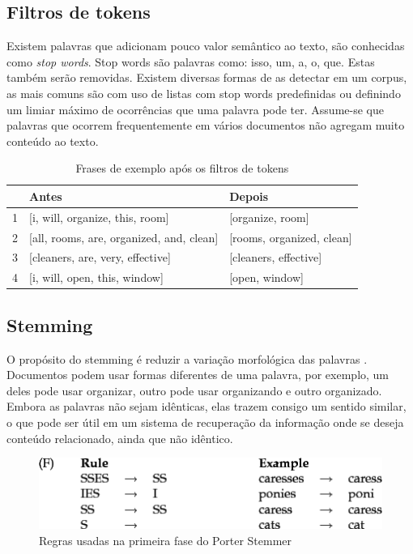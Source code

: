 \subsection{Filtros de tokens}
Existem palavras que adicionam pouco valor semântico ao texto, são conhecidas como \textit{stop words}. Stop words são palavras como: isso, um, a, o, que. Estas também serão removidas. Existem diversas formas de as detectar em um corpus, as mais comuns são com uso de listas com stop words predefinidas ou definindo um limiar máximo de ocorrências que uma palavra pode ter. Assume-se que palavras que ocorrem frequentemente em vários documentos não agregam muito conteúdo ao texto.

\begin{table}[htb]
	\centering
    \def\arraystretch{1.2} %
    \begin{tabular}{|l|l|l|}
        \hline
        & \textbf{Antes} & \textbf{Depois} \\ \hline
        1 & [i, will, organize, this, room] & [organize, room]            \\ \hline
        2 & [all, rooms, are, organized, and, clean] & [rooms, organized, clean] \\ \hline
        3 & [cleaners, are, very, effective] & [cleaners, effective]                              \\ \hline
        4 & [i, will, open, this, window] & [open, window]                             \\ \hline
    \end{tabular}
	\caption{Frases de exemplo após os filtros de tokens}
    \label{tab:tokenfilter}
\end{table}

\subsection{Stemming}
O propósito do stemming é reduzir a variação morfológica das palavras \cite{stemmingdef}. Documentos podem usar formas diferentes de uma palavra, por exemplo, um deles pode usar organizar, outro pode usar organizando e outro organizado. Embora as palavras não sejam idênticas, elas trazem consigo um sentido similar, o que pode ser útil em um sistema de recuperação da informação onde se deseja conteúdo relacionado, ainda que não idêntico.

\begin{figure}[htb]
	\centering
	\includegraphics[width=\textwidth]{chapters/project/porterrules.png}
	\caption{Regras usadas na primeira fase do Porter Stemmer}
    \label{fig:porterstemmerprocess}
\end{figure}

